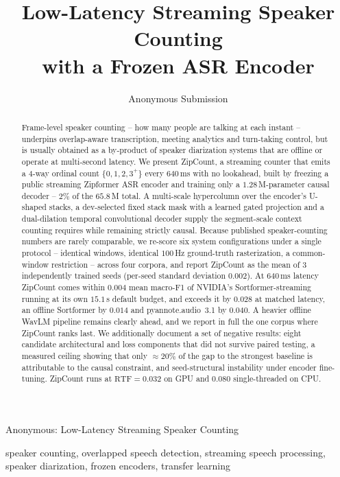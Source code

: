 \documentclass[journal]{IEEEtran}
\newcommand{\sys}{ZipCount}
\begin{document}
\title{Low-Latency Streaming Speaker Counting\\with a Frozen ASR Encoder}
\author{Anonymous Submission}
%
{Anonymous: Low-Latency Streaming Speaker Counting}
\maketitle

\begin{abstract}
Frame-level speaker counting -- how many people are talking at each instant
-- underpins overlap-aware transcription, meeting analytics and turn-taking
control, but is usually obtained as a by-product of speaker diarization
systems that are offline or operate at multi-second latency. We present
\sys{}, a streaming counter that emits a 4-way ordinal count
$\{0,1,2,3^{+}\}$ every $640$\,ms with no lookahead, built by freezing a
public streaming Zipformer ASR encoder and training only a
$1.28$\,M-parameter causal decoder -- $2\%$ of the $65.8$\,M total. A
multi-scale hypercolumn over the encoder's U-shaped stacks, a dev-selected
fixed stack mask with a learned gated projection and a dual-dilation
temporal convolutional decoder supply the segment-scale context counting
requires while remaining strictly causal. Because published speaker-counting
numbers are rarely comparable, we re-score six system configurations under a
single protocol -- identical windows, identical $100$\,Hz ground-truth
rasterization, a common-window restriction -- across four corpora, and
report \sys{} as the mean of 3 independently trained seeds (per-seed
standard deviation $0.002$). At $640$\,ms latency \sys{} comes within
$0.004$ mean macro-F1 of NVIDIA's Sortformer-streaming running at its own
$15.1$\,s default budget, and exceeds it by $0.028$ at matched latency, an
offline Sortformer by $0.014$ and pyannote.audio~3.1 by $0.040$. A heavier
offline WavLM
pipeline remains clearly ahead, and we report in full the one corpus where
\sys{} ranks last. We additionally document a set of negative results:
eight candidate architectural and loss components that did not survive
paired testing, a measured ceiling showing that only $\approx\!20\%$ of the
gap to the strongest baseline is attributable to the causal constraint, and
seed-structural instability under encoder fine-tuning. \sys{} runs at
$\mathrm{RTF}=0.032$ on GPU and $0.080$ single-threaded on CPU.
\end{abstract}

\begin{IEEEkeywords}
speaker counting, overlapped speech detection, streaming speech processing,
speaker diarization, frozen encoders, transfer learning
\end{IEEEkeywords}
\end{document}
